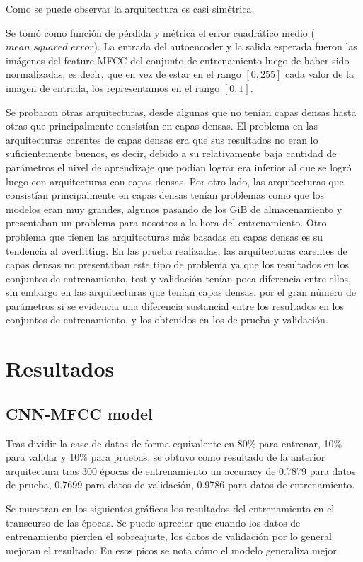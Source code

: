 \documentclass[colorinlistoftodos,twoside,twocolumn,10pt]{article} %
\begin{document}
Como se puede observar la arquitectura es casi sim\'etrica.

Se tom\'o como funci\'on de p\'erdida y m\'etrica el error cuadr\'atico medio ($\textit{mean squared error}$). La entrada del autoencoder y la salida esperada fueron las im\'agenes del feature MFCC del conjunto de entrenamiento luego de haber sido normalizadas, es decir, que en vez de estar en el rango $[0, 255]$ cada valor de la imagen de entrada, los representamos en el rango $[0, 1]$. 

Se probaron otras arquitecturas, desde algunas que no ten\'ian capas densas hasta otras que principalmente consist\'ian en capas densas. El problema en las arquitecturas carentes de capas densas era que sus resultados no eran lo suficientemente buenos, es decir, debido a su relativamente baja cantidad de par\'ametros el nivel de aprendizaje que pod\'ian lograr era inferior al que se logr\'o luego con arquitecturas con capas densas. Por otro lado, las arquitecturas que consist\'ian principalmente en capas densas ten\'ian problemas como que los modelos eran muy grandes, algunos pasando de los GiB de almacenamiento y presentaban un problema para nosotros a la hora del entrenamiento. Otro problema que tienen las arquitecturas m\'as basadas en capas densas es su tendencia al overfitting. En las prueba realizadas, las arquitecturas carentes de capas densas no presentaban este tipo de problema ya que los resultados en los conjuntos de entrenamiento, test y validaci\'on ten\'ian poca diferencia entre ellos, sin embargo en las arquitecturas que ten\'ian capas densas, por el gran n\'umero de par\'ametros si se evidencia una diferencia sustancial entre los resultados en los conjuntos de entrenamiento, y los obtenidos en los de prueba y validaci\'on. 

\section{Resultados}
\subsection {CNN-MFCC model}
Tras dividir la case de datos de forma equivalente en 80\% para entrenar, 10\% para validar y 10\% para pruebas, se obtuvo como resultado de la anterior arquitectura tras 300 \'epocas de entrenamiento un accuracy de 0.7879 para datos de prueba, 0.7699 para datos de validaci\'on, 0.9786 para datos de entrenamiento.

Se muestran en los siguientes gr\'aficos los resultados del entrenamiento en el transcurso de las \'epocas. Se puede apreciar que cuando los datos de entrenamiento pierden el sobreajuste, los datos de validaci\'on por lo general mejoran el resultado. En esos picos se nota c\'omo el modelo generaliza mejor.
\end{document}
